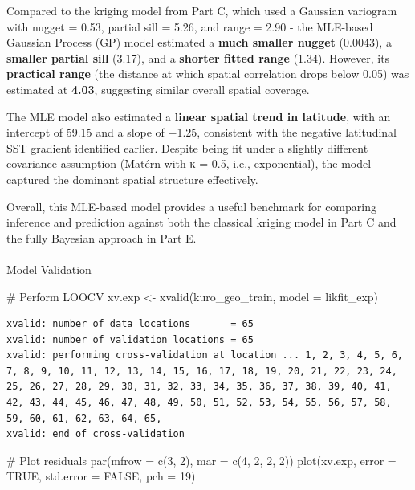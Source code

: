 \documentclass[
  11pt,
]{article}
\makeatletter
\let\oldparagraph\paragraph
\renewcommand{\paragraph}{
    \@ifstar
      \xxxParagraphStar
      \xxxParagraphNoStar
  }
\newcommand{\xxxParagraphStar}[1]{\oldparagraph*{#1}\mbox{}}
\newcommand{\xxxParagraphNoStar}[1]{\oldparagraph{#1}\mbox{}}
\newenvironment{Shaded}{\begin{snugshade}}{\end{snugshade}}
\newcommand{\AttributeTok}[1]{\textcolor[rgb]{0.40,0.45,0.13}{#1}}
\newcommand{\CommentTok}[1]{\textcolor[rgb]{0.37,0.37,0.37}{#1}}
\newcommand{\ConstantTok}[1]{\textcolor[rgb]{0.56,0.35,0.01}{#1}}
\newcommand{\DecValTok}[1]{\textcolor[rgb]{0.68,0.00,0.00}{#1}}
\newcommand{\FunctionTok}[1]{\textcolor[rgb]{0.28,0.35,0.67}{#1}}
\newcommand{\NormalTok}[1]{\textcolor[rgb]{0.00,0.23,0.31}{#1}}
\newcommand{\OtherTok}[1]{\textcolor[rgb]{0.00,0.23,0.31}{#1}}
\makeatother
\begin{document}
Compared to the kriging model from Part C, which used a Gaussian
variogram with nugget = 0.53, partial sill = 5.26, and range = 2.90 -
the MLE-based Gaussian Process (GP) model estimated a \textbf{much
smaller nugget} (0.0043), a \textbf{smaller partial sill} (3.17), and a
\textbf{shorter fitted range} (1.34). However, its \textbf{practical
range} (the distance at which spatial correlation drops below 0.05) was
estimated at \textbf{4.03}, suggesting similar overall spatial coverage.

The MLE model also estimated a \textbf{linear spatial trend in
latitude}, with an intercept of 59.15 and a slope of −1.25, consistent
with the negative latitudinal SST gradient identified earlier. Despite
being fit under a slightly different covariance assumption (Matérn with
κ = 0.5, i.e., exponential), the model captured the dominant spatial
structure effectively.

Overall, this MLE-based model provides a useful benchmark for comparing
inference and prediction against both the classical kriging model in
Part C and the fully Bayesian approach in Part E.

\paragraph{Model Validation}\label{model-validation}

\begin{Shaded}
\begin{Highlighting}[]
\CommentTok{\# Perform LOOCV}
\NormalTok{xv.exp }\OtherTok{\textless{}{-}} \FunctionTok{xvalid}\NormalTok{(kuro\_geo\_train, }\AttributeTok{model =}\NormalTok{ likfit\_exp)}
\end{Highlighting}
\end{Shaded}

\begin{verbatim}
xvalid: number of data locations       = 65
xvalid: number of validation locations = 65
xvalid: performing cross-validation at location ... 1, 2, 3, 4, 5, 6, 7, 8, 9, 10, 11, 12, 13, 14, 15, 16, 17, 18, 19, 20, 21, 22, 23, 24, 25, 26, 27, 28, 29, 30, 31, 32, 33, 34, 35, 36, 37, 38, 39, 40, 41, 42, 43, 44, 45, 46, 47, 48, 49, 50, 51, 52, 53, 54, 55, 56, 57, 58, 59, 60, 61, 62, 63, 64, 65, 
xvalid: end of cross-validation
\end{verbatim}

\begin{Shaded}
\begin{Highlighting}[]
\CommentTok{\# Plot residuals}
\FunctionTok{par}\NormalTok{(}\AttributeTok{mfrow =} \FunctionTok{c}\NormalTok{(}\DecValTok{3}\NormalTok{, }\DecValTok{2}\NormalTok{), }\AttributeTok{mar =} \FunctionTok{c}\NormalTok{(}\DecValTok{4}\NormalTok{, }\DecValTok{2}\NormalTok{, }\DecValTok{2}\NormalTok{, }\DecValTok{2}\NormalTok{))}
\FunctionTok{plot}\NormalTok{(xv.exp, }\AttributeTok{error =} \ConstantTok{TRUE}\NormalTok{, }\AttributeTok{std.error =} \ConstantTok{FALSE}\NormalTok{, }\AttributeTok{pch =} \DecValTok{19}\NormalTok{)}
\end{Highlighting}
\end{Shaded}
\end{document}
